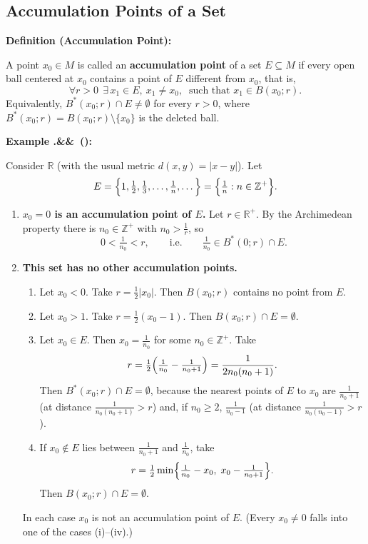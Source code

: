 \documentclass[11pt,a4paper]{article}
\newcommand{\R}{\mathbb{R}}
\newcommand{\Z}{\mathbb{Z}}
\newenvironment{definition}[1]{
	\begin{definitionbox}
		\textbf{\color{primaryColor}Definition (#1):} 
	}{
	\end{definitionbox}
}
\newcounter{examplecnt}[section]
\newenvironment{example}[1][]{
	\stepcounter{examplecnt}
	\begin{examplebox}
		\textbf{\color{exampleColor}Example \thesection.\arabic{examplecnt}\ifx&#1&\else\ (#1)\fi:} 
	}{
	\end{examplebox}
}
\begin{document}
	\subsection{Accumulation Points of a Set}
	
	\begin{definition}{Accumulation Point}
		A point $x_0 \in M$ is called an \textbf{accumulation point} of a set $E \subseteq M$ if every
		open ball centered at $x_0$ contains a point of $E$ different from $x_0$, that is,
		\[
		\forall r>0 \ \ \exists\, x_1 \in E,\ x_1 \neq x_0,\ \text{ such that } x_1 \in B(x_0;r).
		\]
		Equivalently, $B^*(x_0;r)\cap E \neq \emptyset$ for every $r>0$, where
		$B^*(x_0;r)=B(x_0;r)\setminus\{x_0\}$ is the deleted ball.
	\end{definition}
	
	\begin{example}
		Consider $\R$ (with the usual metric $d(x,y)=|x-y|$). Let
		\[
		E = \Bigl\{1,\tfrac12,\tfrac13,\dots,\tfrac1n,\dots\Bigr\} = \Bigl\{\tfrac1n : n\in\Z^+\Bigr\}.
		\]
		\begin{enumerate}[label=(\arabic*)]
			\item \textbf{$x_0 = 0$ is an accumulation point of $E$.} Let $r\in\R^+$. By the Archimedean
			property there is $n_0\in\Z^+$ with $n_0 > \tfrac1r$, so
			\[
			0 < \tfrac{1}{n_0} < r, \qquad\text{i.e.}\qquad \tfrac{1}{n_0}\in B^*(0;r)\cap E .
			\]
			\item \textbf{This set has no other accumulation points.}
			\begin{enumerate}[label=(\roman*)]
				\item Let $x_0<0$. Take $r=\tfrac12|x_0|$. Then $B(x_0;r)$ contains no point from $E$.
				\item Let $x_0>1$. Take $r=\tfrac12(x_0-1)$. Then $B(x_0;r)\cap E=\emptyset$.
				\item Let $x_0\in E$. Then $x_0=\tfrac{1}{n_0}$ for some $n_0\in\Z^+$. Take
				\[
				r=\tfrac12\Bigl(\tfrac1{n_0}-\tfrac1{n_0+1}\Bigr)=\frac{1}{2n_0(n_0+1)} .
				\]
				Then $B^*(x_0;r)\cap E=\emptyset$, because the nearest points of $E$ to $x_0$ are $\tfrac1{n_0+1}$ (at distance $\tfrac{1}{n_0(n_0+1)} > r$) and, if $n_0 \ge 2$, $\tfrac1{n_0-1}$ (at distance $\tfrac{1}{n_0(n_0-1)} > r$).
				\item If $x_0\notin E$ lies between $\tfrac1{n_0+1}$ and $\tfrac1{n_0}$, take
				\[
				r=\tfrac12\min\Bigl\{\tfrac1{n_0}-x_0,\; x_0-\tfrac1{n_0+1}\Bigr\}.
				\]
				Then $B(x_0;r)\cap E=\emptyset$.
			\end{enumerate}
			In each case $x_0$ is not an accumulation point of $E$. (Every $x_0 \neq 0$ falls into one of the cases (i)--(iv).)
		\end{enumerate}
	\end{example}
	
\end{document}
